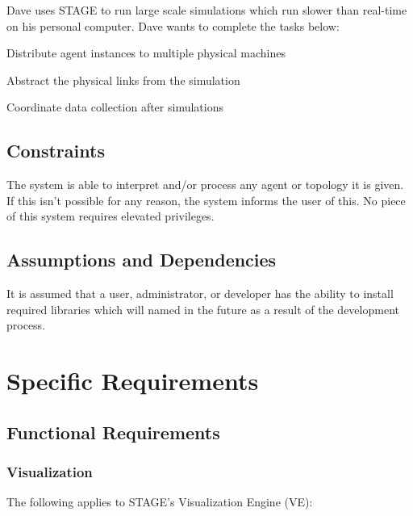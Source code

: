 \documentclass[titlepage]{article}
\begin{document}
Dave uses STAGE to run large scale simulations which run slower than real-time on his personal computer.  Dave wants to
complete the tasks below:

\begin{itemize*}
    \item Distribute agent instances to multiple physical machines
    \item Abstract the physical links from the simulation
    \item Coordinate data collection after simulations
\end{itemize*}

\subsection{Constraints%
  \label{constraints}%
}

The system is able to interpret and/or process any agent or topology it is given.  If this isn't possible for any reason, the system informs the user of this. No piece of this system requires elevated privileges.


\subsection{Assumptions and Dependencies%
  \label{assumptions-and-dependencies}%
}

It is assumed that a user, administrator, or developer has the ability to install required libraries which will named in the future as a result of the development process.


\section{Specific Requirements%
  \label{specific-requirements}%
}

\subsection{Functional Requirements%
    \label{functional}%
}

\subsubsection{Visualization}
The following applies to STAGE's Visualization Engine (VE):
\end{document}
